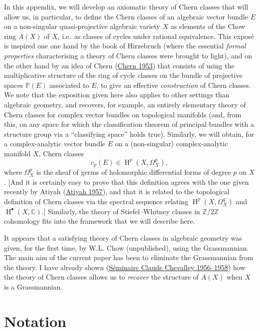 \documentclass{article}
\newcommand{\oldpage}[1]{\marginpar{\footnotesize$\Big\vert$ \textit{p.~#1}}}
\begin{document}
In this appendix, we will develop an axiomatic theory of Chern classes that will allow us, in particular, to define the Chern classes of an algebraic vector bundle \(E\) on a non-singular quasi-projective algebraic variety \(X\) as elements of the Chow ring \(A(X)\) of \(X\), i.e.~as classes of cycles under rational equivalence.
This exposé is inspired one one hand by the book of Hirzebruch (where the essential \emph{formal properties} characterising a theory of Chern classes were brought to light), and on the other hand by an idea of Chern (\protect\hyperlink{ref-2}{Chern 1953}) that consists of using the multiplicative structure of the ring of cycle classes on the bundle of projective spaces \(\mathbb{P}(E)\) associated to \(E\), to give an effective \emph{construction} of Chern classes.
We note that the exposition given here also applies to other settings than algebraic geometry, and recovers, for example, an entirely elementary theory of Chern classes for complex vector bundles on topological manifolds (and, from this, on any space for which the classification theorem of principal bundles with a structure group via a ``classifying space'' holds true).
Similarly, we will obtain, for a complex-analytic vector bundle \(E\) on a (non-singular) complex-analytic manifold \(X\), Chern classes
\[
  c_p(E) \in \operatorname{H}^p(X,\Omega_X^p),
\]
where \(\Omega_X^p\) is the sheaf of germs of holomorphic differential forms of degree \(p\) on \(X\).
{[}And it is certainly easy to prove that this definition agrees with the one given recently by Atiyah (\protect\hyperlink{ref-1}{Atiyah 1957}), and that it is related to the topological definition of Chern classes via the spectral sequence relating \(\operatorname{H}^p(X,\Omega_X^q)\) and \(\operatorname{H}^\bullet(X,\mathbb{C})\).{]}
Similarly, the theory of Stiefel--Whitney classes in \(\mathbb{Z}/2\mathbb{Z}\) cohomology fits into the framework that we will describe here.

\oldpage{138}

It appears that a satisfying theory of Chern classes in algebraic geometry was given, for the first time, by W.L. Chow (unpublished), using the Grassmannian.
The main aim of the current paper has been to eliminate the Grassmannian from the theory.
I have already shown (\protect\hyperlink{ref-4}{Séminaire Claude Chevalley 1956--1958}) how the theory of Chern classes allows us to \emph{recover} the structure of \(A(X)\) when \(X\) is a Grassmannian.

\hypertarget{section-1}{%
\section{Notation}\label{section-1}}
\end{document}
